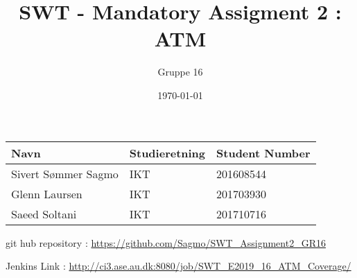 \documentclass{article}
\title{SWT - Mandatory Assigment 2 : ATM}
\author{Gruppe 16}
\date{\today}
\begin{document}
\maketitle

\begin{table}[H]
\centering
\begin{tabular}{|l|l|l|}
\hline
\textbf{Navn}       & \textbf{Studieretning} & \textbf{Student Number} \\ \hline
Sivert Sømmer Sagmo & IKT                    & 201608544             \\ \hline
Glenn Laursen & IKT                    & 201703930             \\ \hline
Saeed Soltani & IKT                    & 201710716             \\ \hline
\end{tabular}
\end{table}

git hub repository : \url{https://github.com/Sagmo/SWT_Assignment2_GR16}

Jenkins Link : \url{http://ci3.ase.au.dk:8080/job/SWT_E2019_16_ATM_Coverage/}

\tableofcontents
\pagebreak














%
%
\end{document}
